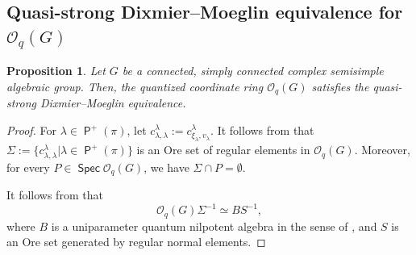 \documentclass[11pt]{article}
\newtheorem{prop}[equation]{Proposition}
\theoremstyle{definition}
\numberwithin{equation}{section}
\newcommand{\qu}{\mathcal{O}}
\DeclareMathOperator{\pois}{\mathsf{P}}
\DeclareMathOperator{\spec}{\mathsf{Spec}}
\begin{document}
	\subsection{Quasi-strong Dixmier--Moeglin equivalence for $\qu_q(G)$}\label{qsdmeqg}	
	
	\begin{prop}\label{qsdmequg}
		Let $G$ be a connected, simply connected complex semisimple algebraic group. Then, the quantized coordinate ring $\qu_q(G)$ satisfies the quasi-strong Dixmier--Moeglin equivalence. 
	\end{prop}
	\begin{proof}
	For $\lambda\in \pois^+(\pi)$, let $c_{\lambda,\lambda}^{\lambda}:= c_{\xi_{\lambda},v_{\lambda}}^{\lambda}$. It follows from \cite[ 9.1.10 and 9.3.10]{JO95} that $\Sigma:= \{c_{\lambda,\lambda}^{\lambda}| \lambda\in\pois^+(\pi)\}$ is an Ore set of regular elements in $\qu_q(G)$. Moreover, for every $P\in\spec\qu_q(G)$, we have $\Sigma\cap P= \emptyset$. 
	
	It follows from  \cite[Lemmas 6.4.1 and 6.4.2]{Ca03} that $$\qu_q(G)\Sigma^{-1}\simeq BS^{-1},$$
	where $B$ is a uniparameter quantum nilpotent algebra in the sense of
	\cite[Definition 3.1]{LLR06}, and $S$ is an Ore set generated by regular
	normal elements.
	

\end{proof}
\end{document}
